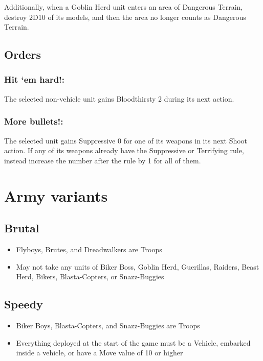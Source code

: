 Additionally, when a Goblin Herd unit enters an area of Dangerous Terrain, destroy 2D10 of its models, and then the area no longer counts as Dangerous Terrain.

\subsection*{Orders}
\subsubsection*{Hit ‘em hard!:} The selected non-vehicle unit gains Bloodthirsty 2 during its next action.

\subsubsection*{More bullets!:} The selected unit gains Suppressive 0 for one of its weapons in its next Shoot action. If any of its weapons already have the Suppressive or Terrifying rule, instead increase the number after the rule by 1 for all of them.


\section*{Army variants}
\subsection*{Brutal}
\begin{itemize}
    \item Flyboys, Brutes, and Dreadwalkers are Troops
    \item May not take any units of Biker Boss, Goblin Herd, Guerillas, Raiders, Beast Herd, Bikers, Blasta-Copters, or Snazz-Buggies
\end{itemize}

\subsection*{Speedy}
\begin{itemize}
    \item Biker Boys, Blasta-Copters, and Snazz-Buggies are Troops
    \item Everything deployed at the start of the game must be a Vehicle, embarked inside a vehicle, or have a Move value of 10 or higher
\end{itemize}




\pagebreak




